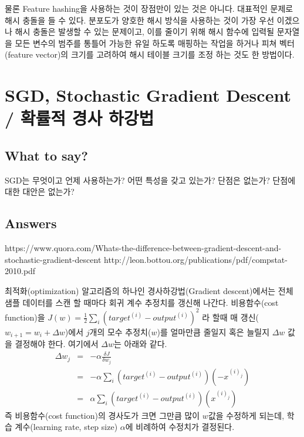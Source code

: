 \documentclass[oneside,b5paper,11pt]{article} %
\begin{document}
 물론 Feature hashing을 사용하는 것이 장점만이 있는 것은 아니다. 대표적인 문제로 해시 충돌을 들 수 있다. 분포도가 양호한 해시 방식을 사용하는 것이 가장 우선 이겠으나 해시 충돌은 발생할 수 있는 문제이고, 이를 줄이기 위해 해시 함수에 입력될 문자열을 모든 변수의 범주를 통틀어 가능한 유일 하도록 매핑하는 작업을 하거나 피쳐 벡터(feature vector)의 크기를 고려하여 해시 테이블 크기를 조정 하는 것도 한 방법이다.













\section{SGD, Stochastic Gradient Descent / 확률적 경사 하강법}
\subsection{What to say?}
SGD는 무엇이고 언제 사용하는가? 어떤 특성을 갖고 있는가? 단점은 없는가? 단점에 대한 대안은 없는가?

\subsection{Answers}
https://www.quora.com/Whats-the-difference-between-gradient-descent-and-stochastic-gradient-descent
http://leon.bottou.org/publications/pdf/compstat-2010.pdf


최적화(optimization) 알고리즘의 하나인 경사하강법(Gradient descent)에서는 전체 샘플 데이터를 스캔 할 때마다 회귀 계수 추정치를 갱신해 나간다. 비용함수(cost function)을 $J(w) = \frac{1}{2} \sum_{i}(target^{(i)} - output^{(i)})^{2}$ 라 할때 매 갱신($w_{i+1}=w_{i}+\Delta w$)에서 $j$개의 모수 추정치($w$)를 얼마만큼 줄일지 혹은 늘릴지 $\Delta w$ 값을 결정해야 한다. 여기에서 $\Delta w$는 아래와 같다.
\begin{eqnarray}
\Delta w_{j} 	&=& -\alpha \frac{\delta J}{\delta w_{j}} \\
							&=& -\alpha \sum_{i}(target^{(i)} - output^{(i)})(-x^{(i)_{j}}) \\
							&=& \alpha \sum_{i}(target^{(i)} - output^{(i)})(x^{(i)_{j}})
\end{eqnarray}
즉 비용함수(cost function)의 경사도가 크면 그만큼 많이 $w$값을 수정하게 되는데, 학습 계수(learning rate, step size) $\alpha$에 비례하여 수정치가 결정된다.
\end{document}
